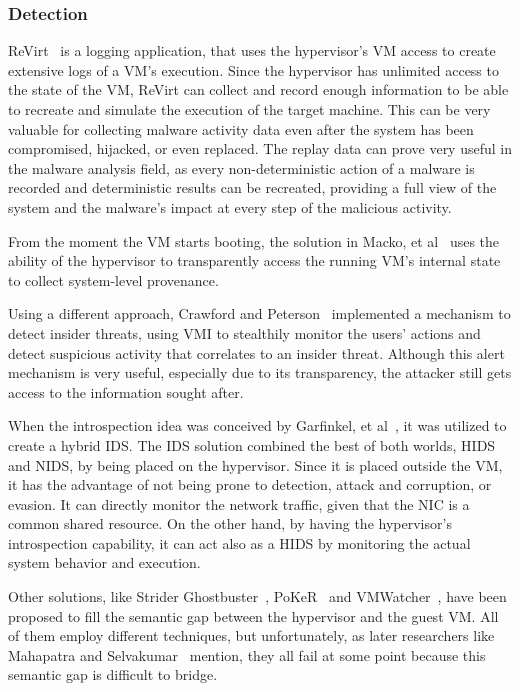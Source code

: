 \subsubsection{Detection}

\par ReVirt~\cite{dunlap2002revirt} is a logging application, that uses the hypervisor’s \ac{VM} access to create extensive logs of a \ac{VM}’s execution. Since the hypervisor has unlimited access to the state of the \ac{VM}, ReVirt can collect and record enough information to be able to recreate and simulate the execution of the target machine. This can be very valuable for collecting malware activity data even after the system has been compromised, hijacked, or even replaced. The replay data can prove very useful in the malware analysis field, as every non-deterministic action of a malware is recorded and deterministic results can be recreated, providing a full view of the system and the malware's impact at every step of the malicious activity.

\par From the moment the \ac{VM} starts booting, the solution in Macko, et al~\cite{macko2011collecting} uses the ability of the hypervisor to transparently access the running \ac{VM}’s internal state to collect system-level provenance. 

\par Using a different approach, Crawford and Peterson~\cite{crawford2013insider} implemented a mechanism to detect insider threats, using \ac{VMI} to stealthily monitor the users' actions and detect suspicious activity that correlates to an insider threat. Although this alert mechanism is very useful, especially due to its transparency, the attacker still gets access to the information sought after.

\par When the introspection idea was conceived by Garfinkel, et al~\cite{garfinkel2003virtual}, it was utilized to create a hybrid \ac{IDS}. The \ac{IDS} solution combined the best of both worlds, \ac{HIDS} and \ac{NIDS}, by being placed on the hypervisor. Since it is placed outside the \ac{VM}, it has the advantage of not being prone to detection, attack and corruption, or evasion. It can directly monitor the network traffic, given that the \ac{NIC} is a common shared resource. On the other hand, by having the hypervisor’s introspection capability, it can act also as a \ac{HIDS} by monitoring the actual system behavior and execution. 

\par Other solutions, like Strider Ghostbuster~\cite{wang2005detecting}, PoKeR~\cite{riley2009multi} and VMWatcher~\cite{jiang2007stealthy}, have been proposed to fill the semantic gap between the hypervisor and the guest \ac{VM}. All of them employ different techniques, but unfortunately, as later researchers like Mahapatra and Selvakumar~\cite{mahapatra2011online} mention, they all fail at some point because this semantic gap is difficult to bridge. 

